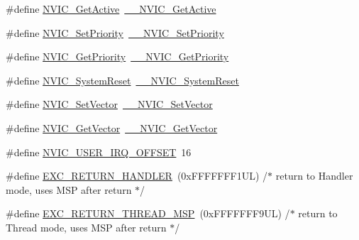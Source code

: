 \begin{DoxyCompactItemize}
\item 
\#define \hyperlink{group___c_m_s_i_s___core___n_v_i_c_functions_ga58ad3f352f832235ab3b192ff4745320}{N\+V\+I\+C\+\_\+\+Get\+Active}~\hyperlink{group___c_m_s_i_s___core___n_v_i_c_functions_gaa2837003c28c45abf193fe5e8d27f593}{\+\_\+\+\_\+\+N\+V\+I\+C\+\_\+\+Get\+Active}
\item 
\#define \hyperlink{group___c_m_s_i_s___core___n_v_i_c_functions_gae0e9d0e2f7b6133828c71b57d4941c35}{N\+V\+I\+C\+\_\+\+Set\+Priority}~\hyperlink{group___c_m_s_i_s___core___n_v_i_c_functions_ga505338e23563a9c074910fb14e7d45fd}{\+\_\+\+\_\+\+N\+V\+I\+C\+\_\+\+Set\+Priority}
\item 
\#define \hyperlink{group___c_m_s_i_s___core___n_v_i_c_functions_gaf59b9d0a791d2157abb319753953eceb}{N\+V\+I\+C\+\_\+\+Get\+Priority}~\hyperlink{group___c_m_s_i_s___core___n_v_i_c_functions_gaeb9dc99c8e7700668813144261b0bc73}{\+\_\+\+\_\+\+N\+V\+I\+C\+\_\+\+Get\+Priority}
\item 
\#define \hyperlink{group___c_m_s_i_s___core___n_v_i_c_functions_ga6aa0367d3642575610476bf0366f0c48}{N\+V\+I\+C\+\_\+\+System\+Reset}~\hyperlink{group___c_m_s_i_s___core___n_v_i_c_functions_ga0d9aa2d30fa54b41eb780c16e35b676c}{\+\_\+\+\_\+\+N\+V\+I\+C\+\_\+\+System\+Reset}
\item 
\#define \hyperlink{group___c_m_s_i_s___core___n_v_i_c_functions_ga804af63bb4c4c317387897431814775d}{N\+V\+I\+C\+\_\+\+Set\+Vector}~\hyperlink{group___c_m_s_i_s___core___n_v_i_c_functions_ga0df355460bc1783d58f9d72ee4884208}{\+\_\+\+\_\+\+N\+V\+I\+C\+\_\+\+Set\+Vector}
\item 
\#define \hyperlink{group___c_m_s_i_s___core___n_v_i_c_functions_ga955eb1c33a3dcc62af11a8385e8c0fc8}{N\+V\+I\+C\+\_\+\+Get\+Vector}~\hyperlink{group___c_m_s_i_s___core___n_v_i_c_functions_ga44b665d2afb708121d9b10c76ff00ee5}{\+\_\+\+\_\+\+N\+V\+I\+C\+\_\+\+Get\+Vector}
\item 
\#define \hyperlink{group___c_m_s_i_s___core___n_v_i_c_functions_ga8045d905a5ca57437d8e6f71ffcb6df5}{N\+V\+I\+C\+\_\+\+U\+S\+E\+R\+\_\+\+I\+R\+Q\+\_\+\+O\+F\+F\+S\+ET}~16
\item 
\#define \hyperlink{group___c_m_s_i_s___core___n_v_i_c_functions_gaa6fa2b10f756385433e08522d9e4632f}{E\+X\+C\+\_\+\+R\+E\+T\+U\+R\+N\+\_\+\+H\+A\+N\+D\+L\+ER}~(0x\+F\+F\+F\+F\+F\+F\+F1\+U\+L)     /$\ast$ return to Handler mode, uses M\+S\+P after return                               $\ast$/
\item 
\#define \hyperlink{group___c_m_s_i_s___core___n_v_i_c_functions_gaea4703101b5e679f695e231f7ee72331}{E\+X\+C\+\_\+\+R\+E\+T\+U\+R\+N\+\_\+\+T\+H\+R\+E\+A\+D\+\_\+\+M\+SP}~(0x\+F\+F\+F\+F\+F\+F\+F9\+U\+L)     /$\ast$ return to Thread mode, uses M\+S\+P after return                                $\ast$/

\end{DoxyCompactItemize}
